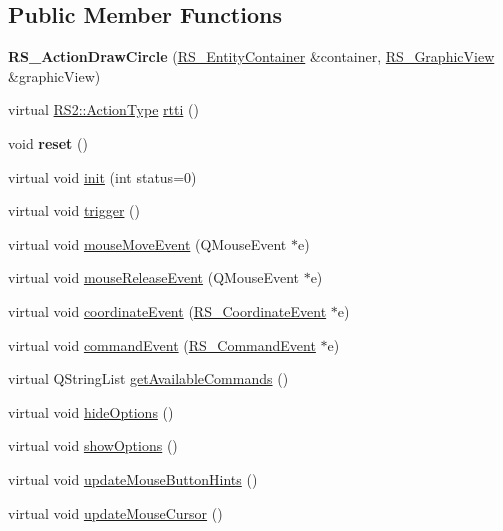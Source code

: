 \subsection*{Public Member Functions}
\begin{DoxyCompactItemize}
\item 
\hypertarget{classRS__ActionDrawCircle_adf0c912f1483f41a2ccf36f52b2d9832}{{\bfseries R\-S\-\_\-\-Action\-Draw\-Circle} (\hyperlink{classRS__EntityContainer}{R\-S\-\_\-\-Entity\-Container} \&container, \hyperlink{classRS__GraphicView}{R\-S\-\_\-\-Graphic\-View} \&graphic\-View)}\label{classRS__ActionDrawCircle_adf0c912f1483f41a2ccf36f52b2d9832}

\item 
virtual \hyperlink{classRS2_afe3523e0bc41fd637b892321cfc4b9d7}{R\-S2\-::\-Action\-Type} \hyperlink{classRS__ActionDrawCircle_ac416d264cb1a7511726203fa7860ce51}{rtti} ()
\item 
\hypertarget{classRS__ActionDrawCircle_a8423763b1fbb8daaba437b7db0c273af}{void {\bfseries reset} ()}\label{classRS__ActionDrawCircle_a8423763b1fbb8daaba437b7db0c273af}

\item 
virtual void \hyperlink{classRS__ActionDrawCircle_ad6d071eabd7d2d843a2e1ff6458a351c}{init} (int status=0)
\item 
virtual void \hyperlink{classRS__ActionDrawCircle_a47ffa1b64c42b89c00c1c38860c0e9f0}{trigger} ()
\item 
virtual void \hyperlink{classRS__ActionDrawCircle_ac91769a809ba239cf83a0512ccc52aa2}{mouse\-Move\-Event} (Q\-Mouse\-Event $\ast$e)
\item 
virtual void \hyperlink{classRS__ActionDrawCircle_a5309905cc04666211e8984e792b0a409}{mouse\-Release\-Event} (Q\-Mouse\-Event $\ast$e)
\item 
virtual void \hyperlink{classRS__ActionDrawCircle_a5df674a2ac52a56787f1894e0cf68933}{coordinate\-Event} (\hyperlink{classRS__CoordinateEvent}{R\-S\-\_\-\-Coordinate\-Event} $\ast$e)
\item 
virtual void \hyperlink{classRS__ActionDrawCircle_afbbbfac8d89664f2b4c6bed416538377}{command\-Event} (\hyperlink{classRS__CommandEvent}{R\-S\-\_\-\-Command\-Event} $\ast$e)
\item 
virtual Q\-String\-List \hyperlink{classRS__ActionDrawCircle_a1a45f745a468a50afd09996af8e16bf6}{get\-Available\-Commands} ()
\item 
virtual void \hyperlink{classRS__ActionDrawCircle_aa15d6079f59c50d149e07197df939b8d}{hide\-Options} ()
\item 
virtual void \hyperlink{classRS__ActionDrawCircle_ab1bea710de7d0a49068c7fafc015062b}{show\-Options} ()
\item 
virtual void \hyperlink{classRS__ActionDrawCircle_aa26f1907cb7d35c65a37a632e2fb794c}{update\-Mouse\-Button\-Hints} ()
\item 
virtual void \hyperlink{classRS__ActionDrawCircle_a5582fc42fc2ca0d5778e8b9f71ce2bb9}{update\-Mouse\-Cursor} ()
\end{DoxyCompactItemize}
